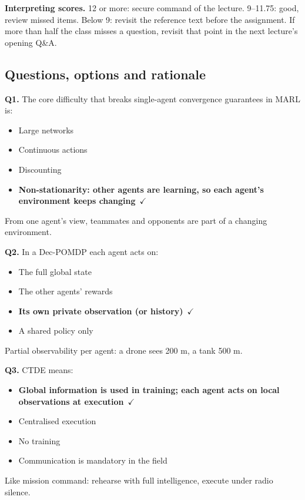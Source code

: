 \documentclass[11pt]{article}
\begin{document}
\textbf{Interpreting scores.} 12 or more: secure command of the lecture. 9--11.75: good, review missed items. Below 9: revisit the reference text before the assignment. If more than half the class misses a question, revisit that point in the next lecture's opening Q\&A.

\subsection*{Questions, options and rationale}

{\small

\noindent\textbf{Q1.} The core difficulty that breaks single-agent convergence guarantees in MARL is:\begin{itemize}[leftmargin=2.2em,itemsep=0pt,topsep=1pt]\item[A.] Large networks\item[B.] Continuous actions\item[C.] Discounting\item[\textbf{D.}] \textbf{Non-stationarity: other agents are learning, so each agent's environment keeps changing}~{\color{GrnN}$\checkmark$}\end{itemize} From one agent's view, teammates and opponents are part of a changing environment.\par\medskip

\noindent\textbf{Q2.} In a Dec-POMDP each agent acts on:\begin{itemize}[leftmargin=2.2em,itemsep=0pt,topsep=1pt]\item[A.] The full global state\item[B.] The other agents' rewards\item[\textbf{C.}] \textbf{Its own private observation (or history)}~{\color{GrnN}$\checkmark$}\item[D.] A shared policy only\end{itemize} Partial observability per agent: a drone sees 200 m, a tank 500 m.\par\medskip

\noindent\textbf{Q3.} CTDE means:\begin{itemize}[leftmargin=2.2em,itemsep=0pt,topsep=1pt]\item[\textbf{A.}] \textbf{Global information is used in training; each agent acts on local observations at execution}~{\color{GrnN}$\checkmark$}\item[B.] Centralised execution\item[C.] No training\item[D.] Communication is mandatory in the field\end{itemize} Like mission command: rehearse with full intelligence, execute under radio silence.\par\medskip

}
\end{document}
